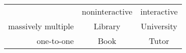 \begin{table}[h!]\centering

\begin{tabular}{ r|c|c| }
\multicolumn{1}{r}{}
 &  \multicolumn{1}{c}{noninteractive}
 &  \multicolumn{1}{c}{interactive} \\
\cline{2-3}
massively multiple & Library & University \\
\cline{2-3}
one-to-one & Book & Tutor \\
\cline{2-3}
\end{tabular}


\end{table}
